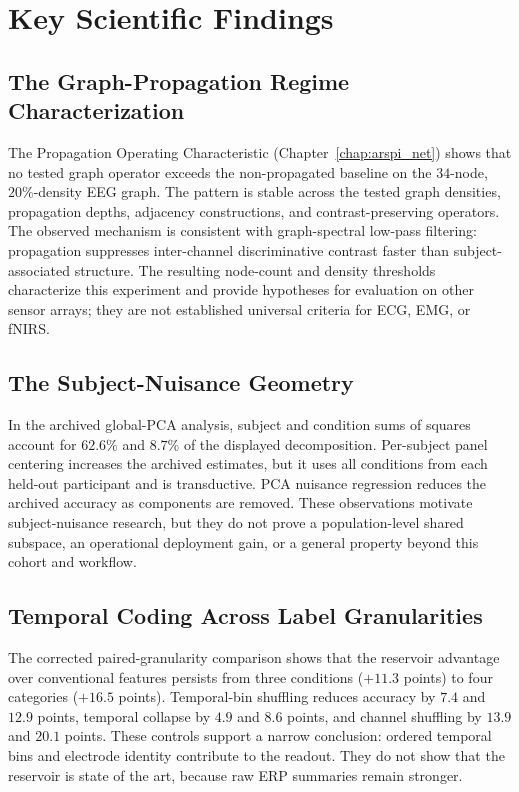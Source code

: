 \section{Key Scientific Findings}

\subsection{The Graph-Propagation Regime Characterization}

The Propagation Operating Characteristic (Chapter~\ref{chap:arspi_net}) shows that no tested graph operator exceeds the non-propagated baseline on the $34$-node, $20\%$-density EEG graph. The pattern is stable across the tested graph densities, propagation depths, adjacency constructions, and contrast-preserving operators. The observed mechanism is consistent with graph-spectral low-pass filtering: propagation suppresses inter-channel discriminative contrast faster than subject-associated structure. The resulting node-count and density thresholds characterize this experiment and provide hypotheses for evaluation on other sensor arrays; they are not established universal criteria for ECG, EMG, or fNIRS.

\subsection{The Subject-Nuisance Geometry}

In the archived global-PCA analysis, subject and condition sums of squares account for $62.6\%$ and $8.7\%$ of the displayed decomposition. Per-subject panel centering increases the archived estimates, but it uses all conditions from each held-out participant and is transductive. PCA nuisance regression reduces the archived accuracy as components are removed. These observations motivate subject-nuisance research, but they do not prove a population-level shared subspace, an operational deployment gain, or a general property beyond this cohort and workflow.

\subsection{Temporal Coding Across Label Granularities}

The corrected paired-granularity comparison shows that the reservoir advantage over conventional features persists from three conditions ($+11.3$ points) to four categories ($+16.5$ points). Temporal-bin shuffling reduces accuracy by $7.4$ and $12.9$ points, temporal collapse by $4.9$ and $8.6$ points, and channel shuffling by $13.9$ and $20.1$ points. These controls support a narrow conclusion: ordered temporal bins and electrode identity contribute to the readout. They do not show that the reservoir is state of the art, because raw ERP summaries remain stronger.

